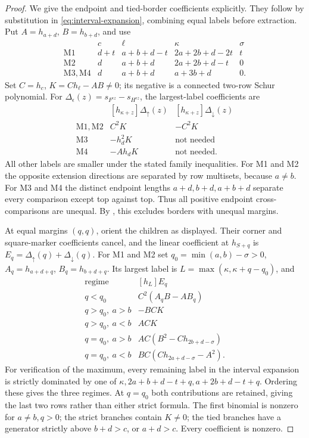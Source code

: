\documentclass[11pt,a4paper]{amsart}
\numberwithin{equation}{section}
\theoremstyle{plain}
\theoremstyle{definition}
\begin{document}
\begin{proof}
We give the endpoint and tied-border coefficients explicitly.  They follow
by substitution in \eqref{eq:interval-expansion}, combining equal labels
before extraction.  Put \(A=h_{a+d}\), \(B=h_{b+d}\), and use
\[
\begin{array}{c|c|c|c|c}
 &c&\ell&\kappa&\sigma\\\hline
\mathrm{M1}&d+t&a+b+d-t&2a+2b+d-2t&t\\
\mathrm{M2}&d&a+b+d&2a+2b+d-t&0\\
\mathrm{M3},\mathrm{M4}&d&a+b+d&a+3b+d&0.
\end{array}
\]
Set \(C=h_c\), \(K=C h_\ell-AB\ne0\); its negative is a connected
two-row Schur polynomial.
For \(\Delta_\epsilon(z)=s_{F^{\epsilon z}}-s_{H^{\epsilon z}}\), the
largest-label coefficients are
\[
\begin{array}{c|c|c}
 &[h_{\kappa+z}]\Delta_\uparrow(z)&[h_{\kappa+z}]\Delta_\downarrow(z)\\\hline
\mathrm{M1},\mathrm{M2}&C^2K&-C^2K\\
\mathrm{M3}&-h_d^2K&\text{not needed}\\
\mathrm{M4}&-Ah_dK&\text{not needed}.
\end{array}
\]
All other labels are smaller under the stated family inequalities.
For M1 and M2 the opposite extension directions are separated by row
multisets, because \(a\ne b\).  For M3 and M4 the distinct endpoint
lengths \(a+d,b+d,a+b+d\) separate every comparison except top against
top.  Thus all positive endpoint cross-comparisons are unequal.
By , this excludes borders with unequal margins.

At equal margins \((q,q)\), orient the children as displayed.
Their corner and square-marker coefficients cancel, and the linear
coefficient at \(h_{S+q}\) is
\(E_q=\Delta_\uparrow(q)+\Delta_\downarrow(q)\).
For M1 and M2 set \(q_0=\min(a,b)-\sigma>0\),
\(A_q=h_{a+d+q}\), \(B_q=h_{b+d+q}\).
Its largest label is \(L=\max(\kappa,\kappa+q-q_0)\), and
\begin{equation}\label{eq:staircase-tied-coefficient}
\begin{array}{c|c}
\text{regime}&[h_L]E_q\\\hline
q<q_0&C^2(A_qB-AB_q)\\
q>q_0,\ a>b&-BCK\\
q>q_0,\ a<b&ACK\\
q=q_0,\ a>b&AC(B^2-C h_{2b+d-\sigma})\\
q=q_0,\ a<b&BC(C h_{2a+d-\sigma}-A^2).
\end{array}
\end{equation}
For verification of the maximum, every remaining label in the interval
expansion is strictly dominated by one of
\(\kappa,2a+b+d-t+q,a+2b+d-t+q\).
Ordering these gives the three regimes.  At \(q=q_0\) both contributions
are retained, giving the last two rows rather than either strict formula.
The first binomial is nonzero for \(a\ne b,q>0\); the strict branches
contain \(K\ne0\); the tied branches have a generator strictly above
\(b+d>c\), or \(a+d>c\).  Every coefficient is nonzero.


\end{proof}
\end{document}
